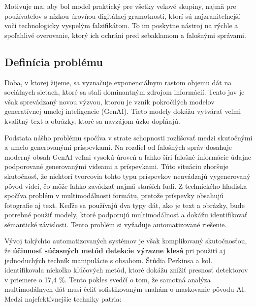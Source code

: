 \documentclass[]{tukediphc}
\begin{document}
Motivuje ma, aby bol model praktický pre všetky vekové skupiny, najmä pre používateľov s nízkou úrovňou digitálnej gramotnosti, ktorí sú najzraniteľnejší voči technologicky vyspelým falzifikátom. To im poskytne nástroj na rýchle a spoľahlivé overovanie, ktorý ich ochráni pred sebaklamom a falošnými správami.





\subsection{Definícia problému}
Doba, v ktorej žijeme, sa vyznačuje exponenciálnym rastom objemu dát na sociálnych sieťach, ktoré sa stali dominantným zdrojom informácií. Tento jav je však sprevádzaný novou výzvou, ktorou je vznik pokročilých modelov generatívnej umelej inteligencie (GenAI). Tieto modely dokážu vytvárať veľmi kvalitný text a obrázky, ktoré sa navzájom úzko dopĺňajú. 

Podstata nášho problému spočíva v strate schopnosti rozlišovať medzi skutočnými a umelo generovanými príspevkami. Na rozdiel od falošných správ dosahuje moderný obsah GenAI veľmi vysokú úroveň a ľahko šíri falošné informácie údajne podporované generovanými videami a príspevkami. Túto situáciu zhoršuje skutočnosť, že niektorí tvorcovia tohto typu príspevkov neuvádzajú vygenerovaný pôvod videí, čo môže ľahko zavádzať najmä starších ľudí. Z technického hľadiska spočíva problém v multimodálnosti formátu, pretože príspevky obsahujú fotografie aj text. Keďže sa používajú dva typy dát, ako je text a obrázky, bude potrebné použiť modely, ktoré podporujú multimodálnosť a dokážu identifikovať sémantické závislosti. Tento problém si vyžaduje automatizované riešenie. 

Vývoj takýchto automatizovaných systémov je však komplikovaný skutočnosťou, že \textbf{účinnosť súčasných metód detekcie výrazne klesá} pri použití aj jednoduchých techník manipulácie s obsahom. Štúdia Perkinsa a kol. identifikovala niekoľko kľúčových metód, ktoré dokážu znížiť presnosť detektorov v priemere o 17,4 \%\cite{Simple_techniques_to_bypass_GenAI_text_detectors:_implications_for_inclusive_education}. Tento pokles svedčí o tom, že samotná analýza multimodálnych dát musí čeliť sofistikovaným snahám o maskovanie pôvodu AI. Medzi najefektívnejšie techniky patria:
\end{document}
